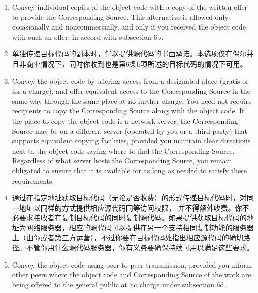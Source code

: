 \documentclass[11pt]{article}
\begin{document}
\begin{enumerate}
\begin{enumerate}
          \item Convey individual copies of the object code with a copy of the
                written offer to provide the Corresponding Source.  This
                alternative is allowed only occasionally and noncommercially, and
                only if you received the object code with such an offer, in accord
                with subsection 6b.

          \item 单独传递目标代码的副本时，伴以提供源代码的书面承诺。本选项仅在偶尔并且非商业情况下，同时你收到也是第6条b项所述的目标代码的情况下可用。

          \item Convey the object code by offering access from a designated
                place (gratis or for a charge), and offer equivalent access to the
                Corresponding Source in the same way through the same place at no
                further charge.  You need not require recipients to copy the
                Corresponding Source along with the object code.  If the place to
                copy the object code is a network server, the Corresponding Source
                may be on a different server (operated by you or a third party)
                that supports equivalent copying facilities, provided you maintain
                clear directions next to the object code saying where to find the
                Corresponding Source.  Regardless of what server hosts the
                Corresponding Source, you remain obligated to ensure that it is
                available for as long as needed to satisfy these requirements.

          \item 通过在指定地址获取目标代码（无论是否收费）的形式传递目标代码时，对同一地址以同样的方式提供相应源代码同等访问权限，
                并不得额外收费。你不必要求接收者在复制目标代码的同时复制源代码。如果提供获取目标代码的地址为网络服务器，相应的源代码可以提供在另一个支持相同复制功能的服务器
                上（由你或者第三方运营），不过你要在目标代码处指出相应源代码的确切路径。不管你用什么源代码服务器，你有义务要确保持续可用以满足这些要求。

          \item Convey the object code using peer-to-peer transmission, provided
                you inform other peers where the object code and Corresponding
                Source of the work are being offered to the general public at no
                charge under subsection 6d.


\end{enumerate}
\end{enumerate}
\end{document}
